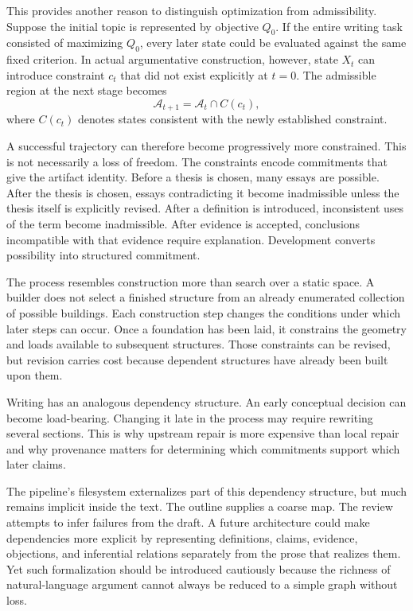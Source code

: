 \documentclass[11pt]{article}
\begin{document}
This provides another reason to distinguish optimization from admissibility. Suppose the initial topic is represented by objective \(Q_0\). If the entire writing task consisted of maximizing \(Q_0\), every later state could be evaluated against the same fixed criterion. In actual argumentative construction, however, state \(X_t\) can introduce constraint \(c_t\) that did not exist explicitly at \(t=0\). The admissible region at the next stage becomes
\[
    \mathcal{A}_{t+1}
    =
    \mathcal{A}_t
    \cap
    C(c_t),
\]
where \(C(c_t)\) denotes states consistent with the newly established constraint.

A successful trajectory can therefore become progressively more constrained. This is not necessarily a loss of freedom. The constraints encode commitments that give the artifact identity. Before a thesis is chosen, many essays are possible. After the thesis is chosen, essays contradicting it become inadmissible unless the thesis itself is explicitly revised. After a definition is introduced, inconsistent uses of the term become inadmissible. After evidence is accepted, conclusions incompatible with that evidence require explanation. Development converts possibility into structured commitment.

The process resembles construction more than search over a static space. A builder does not select a finished structure from an already enumerated collection of possible buildings. Each construction step changes the conditions under which later steps can occur. Once a foundation has been laid, it constrains the geometry and loads available to subsequent structures. Those constraints can be revised, but revision carries cost because dependent structures have already been built upon them.

Writing has an analogous dependency structure. An early conceptual decision can become load-bearing. Changing it late in the process may require rewriting several sections. This is why upstream repair is more expensive than local repair and why provenance matters for determining which commitments support which later claims.

The pipeline's filesystem externalizes part of this dependency structure, but much remains implicit inside the text. The outline supplies a coarse map. The review attempts to infer failures from the draft. A future architecture could make dependencies more explicit by representing definitions, claims, evidence, objections, and inferential relations separately from the prose that realizes them. Yet such formalization should be introduced cautiously because the richness of natural-language argument cannot always be reduced to a simple graph without loss.
\end{document}
